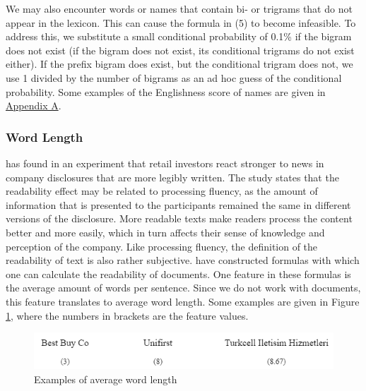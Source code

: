 \documentclass[11pt]{article}
\begin{document}
We may also encounter words or names that contain bi- or trigrams that do not appear in the lexicon. This can cause the formula in (5) to become infeasible. To address this, we substitute a small conditional probability of 0.1\% if the bigram does not exist (if the bigram does not exist, its conditional trigrams do not exist either). If the prefix bigram does exist, but the conditional trigram does not, we use 1 divided by the number of bigrams as an ad hoc guess of the conditional probability. Some examples of the Englishness score of names are given in \hyperref[Appendix A]{Appendix A}.










\subsubsection{Word Length}

\cite{rennekamp2012processing} has found in an experiment that retail investors react stronger to news in company disclosures that are more legibly written. 
The study states that the readability effect may be related to processing fluency, as the amount of information that is presented to the participants remained the same in different versions of the disclosure.
More readable texts make readers process the content better and more easily, which in turn affects their sense of knowledge and perception of the company.
Like processing fluency, the definition of the readability of text is also rather subjective. \cite{kincaid1975derivation} have constructed formulas with which one can calculate the readability of documents. One feature in these formulas is the average amount of words per sentence. Since we do not work with documents, this feature translates to average word length. Some examples are given in Figure \ref{fig:wordlength}, where the numbers in brackets are the feature values.
\vspace{0.5cm}
\begin{figure}[h]
    \centering
    \includegraphics[scale=0.6]{figures/average_length.png}
    \caption{Examples of average word length}
    \label{fig:wordlength}
\end{figure}
\end{document}
